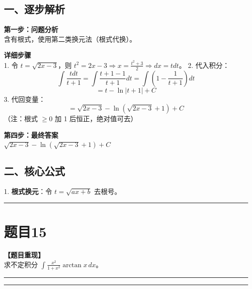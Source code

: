 \documentclass[12pt, a4paper]{ctexart}
\newcommand{\TopSeparator}{
    \par\noindent\rule{\textwidth}{1.5pt}\vspace{0.5em} %
}
\newcommand{\AnalysisSeparator}{
    \par\noindent\rule{\textwidth}{0.5pt}\vspace{0.2em}\hrule\vspace{0.5em} %
}
\newenvironment{RedAnalysis}{
    \par
    \color{red} %
}{
    \par
    \color{black} %
}
\begin{document}
\begin{RedAnalysis}

\subsection*{一、逐步解析}

\textbf{第一步：问题分析} \\
含有根式，使用第二类换元法（根式代换）。

\textbf{详细步骤} \\
1. 令 $t = \sqrt{2x-3}$，则 $t^2 = 2x-3 \Rightarrow x = \frac{t^2+3}{2} \Rightarrow dx = t dt$。
2. 代入积分：
   \[ \int \frac{t dt}{t+1} = \int \frac{t+1-1}{t+1} dt = \int (1 - \frac{1}{t+1}) dt \]
   \[ = t - \ln|t+1| + C \]
3. 代回变量：
   \[ = \sqrt{2x-3} - \ln(\sqrt{2x-3}+1) + C \]
   （注：根式 $\ge 0$ 加 1 后恒正，绝对值可去）

\textbf{第四步：最终答案} \\
$ \sqrt{2x-3} - \ln(\sqrt{2x-3}+1) + C $

\subsection*{二、核心公式}
1. \textbf{根式换元}：令 $t = \sqrt{ax+b}$ 去根号。

\end{RedAnalysis}

\vspace{2em}

\TopSeparator
\section*{题目15}

\textbf{【题目重现】} \\
求不定积分 $ \int\frac{x^{2}}{1+x^{2}}\arctan x \, dx $。

\AnalysisSeparator
\end{document}
